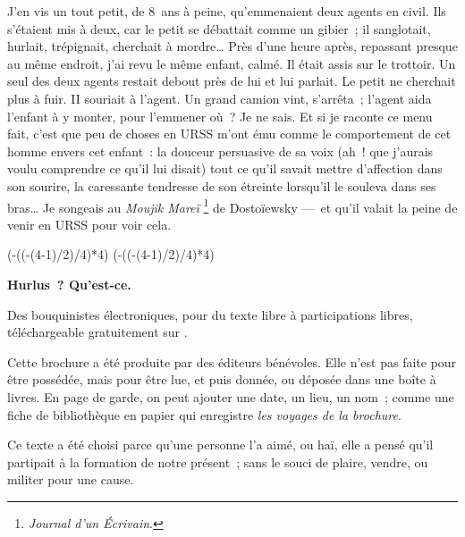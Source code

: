 \documentclass[twoside]{book} %
\newcommand\chapterclose{} %
\def\truncdiv#1#2{((#1-(#2-1)/2)/#2)}
\def\moduloop#1#2{(#1-\truncdiv{#1}{#2}*#2)}
\def\modulo#1#2{\number\numexpr\moduloop{#1}{#2}\relax}
\begin{document}
J’en vis un tout petit, de 8 ans à peine, qu’emmenaient deux agents en civil. Ils s’étaient mis à deux, car le petit se débattait comme un gibier ; il sanglotait, hurlait, trépignait, cherchait à mordre… Près d’une heure après, repassant presque au même endroit, j’ai revu le même enfant, calmé. Il était assis sur le trottoir. Un seul des deux agents restait debout près de lui et lui parlait. Le petit ne cherchait plus à fuir. II souriait à l’agent. Un grand camion vint, s’arrêta ; l’agent aida l’enfant à y monter, pour l’emmener où ? Je ne sais. Et si je raconte ce menu fait, c’est que peu de choses en URSS m’ont ému comme le comportement de cet homme envers cet enfant : la douceur persuasive de sa voix (ah ! que j’aurais voulu comprendre ce qu’il lui disait) tout ce qu’il savait mettre d’affection dans son sourire, la caressante tendresse de son étreinte lorsqu’il le souleva dans ses bras… Je songeais au \emph{Moujik Mareï} \footnote{\emph{Journal d’un Écrivain}.} de Dostoïewsky — et qu’il valait la peine de venir en URSS pour voir cela.
\chapterclose

 


\ifbooklet
  \pagestyle{empty}
  \clearpage
  \ifnum\modulo{\value{page}}{4}=0 \hbox{}\newpage\hbox{}\newpage\fi
  \ifnum\modulo{\value{page}}{4}=1 \hbox{}\newpage\hbox{}\newpage\fi


  \hbox{}\newpage
  \ifodd\value{page}\hbox{}\newpage\fi
  {\centering\color{rubric}\bfseries\noindent\large
    Hurlus ? Qu’est-ce.\par
    \bigskip
  }
  \noindent Des bouquinistes électroniques, pour du texte libre à participations libres,
  téléchargeable gratuitement sur \href{https://hurlus.fr}{}.\par
  \bigskip
  \noindent Cette brochure a été produite par des éditeurs bénévoles.
  Elle n’est pas faite pour être possédée, mais pour être lue, et puis donnée, ou déposée dans une boîte à livres.
  En page de garde, on peut ajouter une date, un lieu, un nom ;
  comme une fiche de bibliothèque en papier qui enregistre \emph{les voyages de la brochure}.
  \par

  Ce texte a été choisi parce qu’une personne l’a aimé,
  ou haï, elle a pensé qu’il partipait à la formation de notre présent ;
  sans le souci de plaire, vendre, ou militer pour une cause.
  \par
\end{document}
